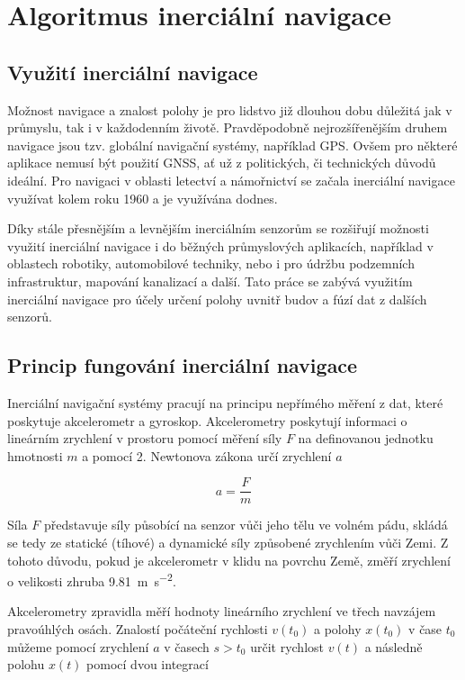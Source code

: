 \chapter{Algoritmus inerciální navigace} \label{INSalg}
\section{Využití inerciální navigace}
Možnost navigace a znalost polohy je pro lidstvo již dlouhou dobu důležitá jak v průmyslu, tak i v každodenním životě. Pravděpodobně nejrozšířenějším druhem navigace jsou tzv. globální navigační systémy, například \ac{GPS}. Ovšem pro některé aplikace nemusí být použití \ac{GNSS}, ať už z politických, či technických důvodů ideální. Pro navigaci v oblasti letectví a námořnictví se začala inerciální navigace využívat kolem roku 1960 a je využívána dodnes. \cite{Tittertonc2004}

Díky stále přesnějším a levnějším inerciálním senzorům se rozšiřují možnosti využití inerciální navigace i do běžných průmyslových aplikacích, například v oblastech robotiky, automobilové techniky, nebo i pro údržbu podzemních infrastruktur, mapování kanalizací a další. \cite{Tittertonc2004} Tato práce se zabývá využitím inerciální navigace pro účely určení polohy uvnitř budov a fúzí dat z dalších senzorů.

\section{Princip fungování inerciální navigace} \label{INSPrinciple}
Inerciální navigační systémy pracují na principu nepřímého měření z dat, které poskytuje akcelerometr a gyroskop.   
Akcelerometry poskytují informaci o lineárním zrychlení v prostoru pomocí měření síly $ F $ na definovanou jednotku hmotnosti $ m $ a pomocí 2. Newtonova zákona určí zrychlení $ a $ \cite{Tittertonc2004}

\begin{equation} \label{eq:2NZ}
a=\frac{F}{m}
\end{equation}

Síla $ F $ představuje síly působící na senzor vůči jeho tělu ve volném pádu, skládá se tedy ze statické (tíhové) a dynamické síly způsobené zrychlením vůči Zemi. \cite{Tittertonc2004}
Z tohoto důvodu, pokud je akcelerometr v klidu na povrchu Země, změří zrychlení o velikosti zhruba \SI{9,81}{\meter\per\second\squared}.

Akcelerometry zpravidla měří hodnoty lineárního zrychlení ve třech navzájem pravoúhlých osách. Znalostí počáteční rychlosti $ v(t_{0}) $ a polohy $ x(t_{0}) $ v čase $ t_{0} $ můžeme pomocí zrychlení $ a $ v časech $ s>t_{0} $ určit rychlost $ v(t) $ a následně polohu $ x(t) $ pomocí dvou integrací \cite{Grewal2013}

